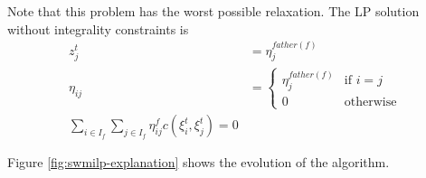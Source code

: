 Note that this problem has the worst possible relaxation. The LP solution without integrality constraints is
\begin{align}
  \label{eq:2}
  z_j^t &= \eta_j^{father(f)}\\
  \eta_{ij} &= \left\{
    \begin{array}{ll}
      \eta_j^{father(f)}&\text{if } i=j\\
      0&\text{otherwise}
    \end{array}
  \right.\\
  \sum_{i\in I_f}\sum_{j\in I_f}\eta_{ij}^fc(\xi_i^t,\xi_j^t) = 0
\end{align}

Figure \ref{fig:swmilp-explanation} shows the evolution of the algorithm.
